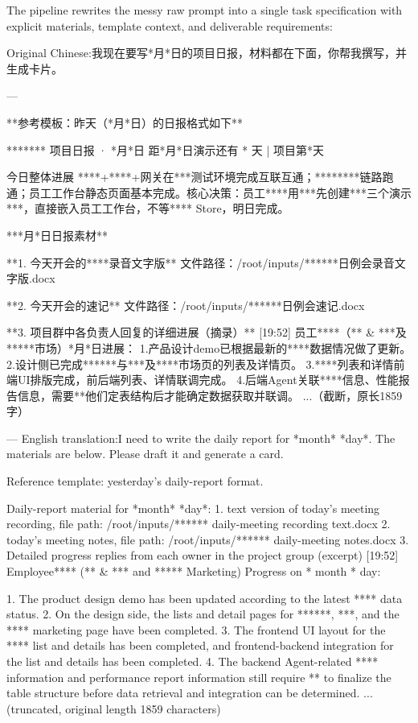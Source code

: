 \documentclass{llmxive}
\begin{document}
The pipeline rewrites the messy raw prompt into a single task specification with explicit materials, template context, and deliverable requirements:

\begin{casebox}\scriptsize
\begin{caselines}
Original Chinese:\nopagebreak[4]
我现在要写*月*日的项目日报，材料都在下面，你帮我撰写，并生成卡片。

---

**参考模板：昨天（*月*日）的日报格式如下**

 ******* 项目日报 · *月*日
距*月*日演示还有 * 天 | 项目第*天

今日整体进展
****+****+网关在***测试环境完成互联互通；********链路跑通；员工工作台静态页面基本完成。核心决策：员工****用***先创建***三个演示***，直接嵌入员工工作台，不等**** Store，明日完成。

***月*日日报素材**

**1. 今天开会的****录音文字版**
文件路径：/root/inputs/******日例会录音文字版.docx

**2. 今天开会的速记**
文件路径：/root/inputs/******日例会速记.docx

**3. 项目群中各负责人回复的详细进展（摘录）**
[19:52] 员工****（** \& ***及*****市场）*月*日进展：
1.产品设计demo已根据最新的****数据情况做了更新。
2.设计侧已完成******与***及****市场页的列表及详情页。
3.****列表和详情前端UI排版完成，前后端列表、详情联调完成。
4.后端Agent关联****信息、性能报告信息，需要**他们定表结构后才能确定数据获取并联调。
...（截断，原长1859字）

---
English translation:\nopagebreak[4]
I need to write the daily report for *month* *day*. The materials are below. Please draft it and generate a card.

Reference template: yesterday's daily-report format.

Daily-report material for *month* *day*:
1. text version of today's meeting recording, file path: /root/inputs/****** daily-meeting recording text.docx
2. today's meeting notes, file path: /root/inputs/****** daily-meeting notes.docx
3. Detailed progress replies from each owner in the project group (excerpt)
[19:52] Employee**** (** \& *** and ***** Marketing) Progress on * month * day:

1. The product design demo has been updated according to the latest **** data status.
2. On the design side, the lists and detail pages for ******, ***, and the **** marketing page have been completed.
3. The frontend UI layout for the **** list and details has been completed, and frontend-backend integration for the list and details has been completed.
4. The backend Agent-related **** information and performance report information still require ** to finalize the table structure before data retrieval and integration can be determined.
   ... (truncated, original length 1859 characters)
\end{caselines}
\end{casebox}
\end{document}
